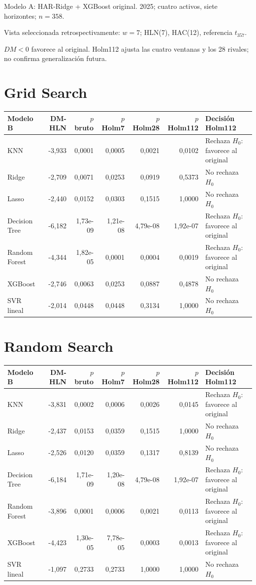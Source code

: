 \documentclass[10pt]{article}
\begin{document}
\noindent Modelo A: HAR-Ridge + XGBoost original. 2025; cuatro activos, siete horizontes; $n=358$.
\par Vista seleccionada retrospectivamente: $w=7$; HLN(7), HAC(12), referencia $t_{357}$.
\par $DM<0$ favorece al original. Holm112 ajusta las cuatro ventanas y los 28 rivales; no confirma generalización futura.
\section*{Grid Search}
\begin{center}\small\begin{tabular}{lrrrrrl}\toprule
Modelo B & DM-HLN & $p$ bruto & $p$ Holm7 & $p$ Holm28 & $p$ Holm112 & Decisión Holm112\\\midrule
KNN & -3,933 & 0,0001 & 0,0005 & 0,0021 & 0,0102 & Rechaza $H_0$: favorece al original\\
Ridge & -2,709 & 0,0071 & 0,0253 & 0,0919 & 0,5373 & No rechaza $H_0$\\
Lasso & -2,440 & 0,0152 & 0,0303 & 0,1515 & 1,0000 & No rechaza $H_0$\\
Decision Tree & -6,182 & 1,73e-09 & 1,21e-08 & 4,79e-08 & 1,92e-07 & Rechaza $H_0$: favorece al original\\
Random Forest & -4,344 & 1,82e-05 & 0,0001 & 0,0004 & 0,0019 & Rechaza $H_0$: favorece al original\\
XGBoost & -2,746 & 0,0063 & 0,0253 & 0,0887 & 0,4878 & No rechaza $H_0$\\
SVR lineal & -2,014 & 0,0448 & 0,0448 & 0,3134 & 1,0000 & No rechaza $H_0$\\
\bottomrule\end{tabular}\end{center}
\section*{Random Search}
\begin{center}\small\begin{tabular}{lrrrrrl}\toprule
Modelo B & DM-HLN & $p$ bruto & $p$ Holm7 & $p$ Holm28 & $p$ Holm112 & Decisión Holm112\\\midrule
KNN & -3,831 & 0,0002 & 0,0006 & 0,0026 & 0,0145 & Rechaza $H_0$: favorece al original\\
Ridge & -2,437 & 0,0153 & 0,0359 & 0,1515 & 1,0000 & No rechaza $H_0$\\
Lasso & -2,526 & 0,0120 & 0,0359 & 0,1317 & 0,8139 & No rechaza $H_0$\\
Decision Tree & -6,184 & 1,71e-09 & 1,20e-08 & 4,79e-08 & 1,92e-07 & Rechaza $H_0$: favorece al original\\
Random Forest & -3,896 & 0,0001 & 0,0006 & 0,0021 & 0,0113 & Rechaza $H_0$: favorece al original\\
XGBoost & -4,423 & 1,30e-05 & 7,78e-05 & 0,0003 & 0,0013 & Rechaza $H_0$: favorece al original\\
SVR lineal & -1,097 & 0,2733 & 0,2733 & 1,0000 & 1,0000 & No rechaza $H_0$\\
\bottomrule\end{tabular}\end{center}
\end{document}
